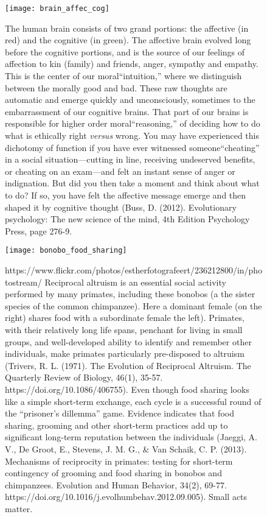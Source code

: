 \newpage
\begin{figure}[p]
\centering
  \texttt{[image: brain\_affec\_cog]}%

\caption{The human brain consists of two grand portions: the affective (in red) and the cognitive (in green). The affective brain evolved long before the cognitive portions, and is the source of our feelings of affection to kin (family) and friends, anger, sympathy and empathy. This is the center of our moral``intuition,'' where we distinguish between the morally good and bad. These raw thoughts are automatic and emerge quickly and unconsciously, sometimes to the embarrassment of our cognitive brains. That part of our brains is responsible for higher order moral``reasoning,'' of deciding how to do what is ethically right \textit{versus} wrong. You may have experienced this dichotomy of function if you have ever witnessed someone``cheating'' in a social situation---cutting in line, receiving undeserved benefits, or cheating on an exam---and felt an instant sense of anger or indignation. But did you then take a moment and think about what to do? If so, you have felt the affective message emerge and then shaped it by cognitive thought (Buss, D. (2012). Evolutionary psychology: The new science of the mind, 4th Edition Psychology Press, page 276-9. }
\label{fig:brain_affec_cog}
\end{figure}

\newpage
\begin{figure}[p]
\centering
  \texttt{[image: bonobo\_food\_sharing]}%

\caption{https://www.flickr.com/photos/estherfotografeert/236212800/in/photostream/ Reciprocal altruism is an essential social activity performed by many primates, including these bonobos (a the sister species of the common chimpanzee). Here a dominant female (on the right) shares food with a subordinate female the left). Primates, with their relatively long life spans, penchant for living in small groups, and well-developed ability to identify and remember other individuals, make primates particularly pre-disposed to altruism (Trivers, R. L. (1971). The Evolution of Reciprocal Altruism. The Quarterly Review of Biology, 46(1), 35-57. https://doi.org/10.1086/406755). Even though food sharing looks like a simple short-term exchange, each cycle is a successful round of the ``prisoner's dillemma'' game. Evidence indicates that food sharing, grooming and other short-term practices add up to significant long-term reputation between the individuals (Jaeggi, A. V., De Groot, E., Stevens, J. M. G., \& Van Schaik, C. P. (2013). Mechanisms of reciprocity in primates: testing for short-term contingency of grooming and food sharing in bonobos and chimpanzees. Evolution and Human Behavior, 34(2), 69-77. https://doi.org/10.1016/j.evolhumbehav.2012.09.005). Small acts matter.}
\label{fig:bonobos_food_sharing}
\end{figure}


